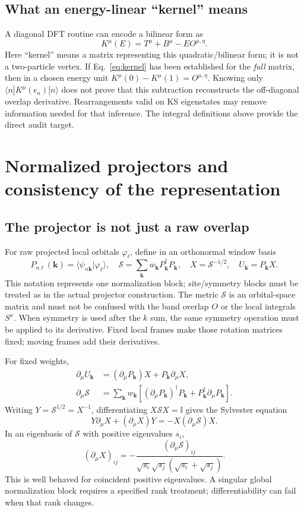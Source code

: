 \documentclass[11pt]{article}
\newcommand{\kb}{\mathbf k}
\newcommand{\Id}{\mathbb I}
\newcommand{\pa}{\partial_\mu}
\newcommand{\ip}[2]{\langle #1|#2\rangle}
\newcommand{\newpart}[1]{\par\Needspace{12\baselineskip}\section{#1}}
\begin{document}
\subsection{What an energy-linear ``kernel'' means}
A diagonal DFT routine can encode a bilinear form as
\begin{equation}
 K^\mu(E)=T^\mu+B^\mu-E O^{\mu,\eta}.
 \label{eq:kernel}
\end{equation}
Here ``kernel'' means a matrix representing this quadratic/bilinear form;
it is not a two-particle vertex. If Eq.~\eqref{eq:kernel} has been
established for the \emph{full} matrix, then in a chosen energy unit
$K^\mu(0)-K^\mu(1)=O^{\mu,\eta}$.
Knowing only $\langle n|K^\mu(\epsilon_n)|n\rangle$ does not prove
that this subtraction reconstructs the off-diagonal overlap derivative.
Rearrangements valid on KS eigenstates may remove information needed
for that inference. The integral definitions above provide the direct
audit target.

\newpart{Normalized projectors and consistency of the representation}
\label{sec:projector}
\subsection{The projector is not just a raw overlap}
For raw projected local orbitals $\varphi_\ell$, define in an
orthonormal window basis
\begin{equation}
 P_{n\ell}(\kb)=\ip{\psi_{n\kb}}{\varphi_\ell},\quad
 \mathcal S=\sum_\kb w_\kb P_\kb^\dagger P_\kb,\quad
 X=\mathcal S^{-1/2},\quad U_\kb=P_\kb X.
 \label{eq:U}
\end{equation}
This notation represents one normalization block; site/symmetry blocks
must be treated as in the actual projector construction.
The metric $\mathcal S$ is an orbital-space matrix and must not be
confused with the band overlap $O$ or the local integrals $S^x$.
When symmetry is used after the $k$ sum, the same symmetry operation
must be applied to its derivative. Fixed local frames make those
rotation matrices fixed; moving frames add their derivatives.

For fixed weights,
\begin{align}
 \pa U_\kb&=(\pa P_\kb)X+P_\kb\pa X,\label{eq:Uprime}\\
 \pa\mathcal S&=\sum_\kb w_\kb
       [(\pa P_\kb)^\dagger P_\kb+P_\kb^\dagger\pa P_\kb].
 \label{eq:Sprimeorth}
\end{align}
Writing $Y=\mathcal S^{1/2}=X^{-1}$, differentiating
$X\mathcal S X=\Id$ gives the Sylvester equation
\begin{equation}
 Y\pa X+(\pa X)Y=-X(\pa\mathcal S)X.
 \label{eq:Xprime}
\end{equation}
In an eigenbasis of $\mathcal S$ with positive eigenvalues $s_i$,
\begin{equation}
 (\pa X)_{ij}=-\frac{(\pa\mathcal S)_{ij}}
        {\sqrt{s_i}\sqrt{s_j}(\sqrt{s_i}+\sqrt{s_j})}.
\end{equation}
This is well behaved for coincident positive eigenvalues. A singular
global normalization block requires a specified rank treatment;
differentiability can fail when that rank changes.
\end{document}
